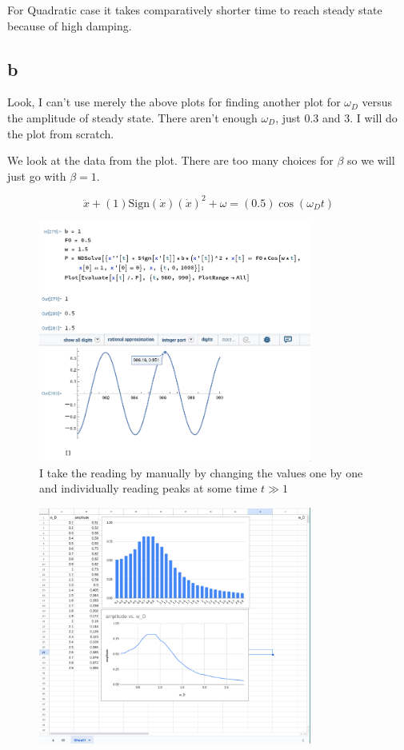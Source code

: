 \documentclass[12pt,letter]{article}
\begin{document}
{For Quadratic case it takes comparatively shorter time to reach steady state because of high damping. 
\newpage
\subsection*{b} 
Look, I can't use merely the above plots for finding another plot for $\omega_D$ versus the amplitude of steady state. There aren't enough $\omega_D$, just $0.3$ and $3$. I will do the plot from scratch. 

We look at the data from the plot. There are too many choices for $\beta$ so we will just go with $\beta = 1$. 

\[
\ddot{x} + (1) \text{Sign}(\dot{x})(\dot{x})^2  + \omega  = (0.5) \cos(\omega_D t)
\]
\begin{figure}[H]
	\centering
	\includegraphics[width=0.8\textwidth]{ss/sshw4/tg1.png}
	\caption{I take the reading by manually by changing the values one by one and individually reading peaks at some time $t \gg 1$}
	\label{fig:ss-sshw4-tg1-png}
\end{figure}
\begin{figure}[H]
	\centering
	\includegraphics[width=0.8\textwidth]{ss/sshw4/tg2.png}

\end{figure}}
\end{document}
